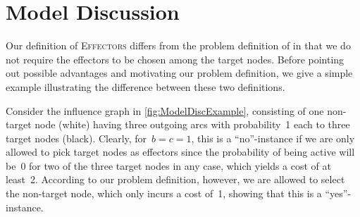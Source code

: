 \documentclass{article}
\newcommand{\np}{{\mathsf{NP}}}
\newcommand{\fpt}{{\mathsf{FPT}}}
\newcommand{\w}{{\mathsf{W}}}
\newcommand{\probEffectors}{\textsc{Effectors}\xspace}
\begin{document}
\begin{table}[t]
\end{table}

\section{Model Discussion}
\label{sec:Model}
Our definition
of \probEffectors differs from the problem definition of
\citet{LTGMH10} in that we do not require the effectors to be chosen
among the target nodes.
Before pointing out possible advantages and motivating our problem definition,
we give a simple example illustrating the difference between these two definitions.

Consider the influence graph in \autoref{fig:ModelDiscExample},
consisting of one non-target node (white) having three outgoing arcs
with probability~1 each to three target nodes (black).
Clearly, for~$b=c=1$, this is a ``no''-instance if we are
only allowed to pick target nodes as effectors since
the probability of being active will be~0 for two of the three target
nodes in any case, which yields a cost of at least~2.
According to our problem definition, however, we are allowed to select the
non-target node, which only incurs a cost of~1, showing that this
is a ``yes''-instance.
\end{document}
